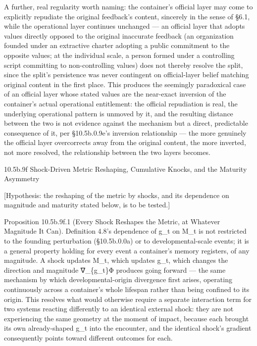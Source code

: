 \documentclass[
]{article}
\begin{document}
A further, real regularity worth naming: the container's official layer
may come to explicitly repudiate the original feedback's content,
sincerely in the sense of §6.1, while the operational layer continues
unchanged --- an official layer that adopts values directly opposed to
the original inaccurate feedback (an organization founded under an
extractive charter adopting a public commitment to the opposite values;
at the individual scale, a person formed under a controlling script
committing to non-controlling values) does not thereby resolve the
split, since the split's persistence was never contingent on
official-layer belief matching original content in the first place. This
produces the seemingly paradoxical case of an official layer whose
stated values are the near-exact inversion of the container's actual
operational entitlement: the official repudiation is real, the
underlying operational pattern is unmoved by it, and the resulting
distance between the two is not evidence against the mechanism but a
direct, predictable consequence of it, per §10.5b.0.9e's inversion
relationship --- the more genuinely the official layer overcorrects away
from the original content, the more inverted, not more resolved, the
relationship between the two layers becomes.

10.5b.9f Shock-Driven Metric Reshaping, Cumulative Knocks, and the
Maturity Asymmetry

{[}Hypothesis: the reshaping of the metric by shocks, and its dependence
on magnitude and maturity stated below, is to be tested.{]}

Proposition 10.5b.9f.1 (Every Shock Reshapes the Metric, at Whatever
Magnitude It Can). Definition 4.8's dependence of g\_t on M\_t is not
restricted to the founding perturbation (§10.5b.0.0a) or to
developmental-scale events; it is a general property holding for every
event a container's memory registers, of any magnitude. A shock updates
M\_t, which updates g\_t, which changes the direction and magnitude
∇\_\{g\_t\}Φ produces going forward --- the same mechanism by which
developmental-origin divergence first arises, operating continuously
across a container's whole lifespan rather than being confined to its
origin. This resolves what would otherwise require a separate
interaction term for two systems reacting differently to an identical
external shock: they are not experiencing the same geometry at the
moment of impact, because each brought its own already-shaped g\_t into
the encounter, and the identical shock's gradient consequently points
toward different outcomes for each.
\end{document}
